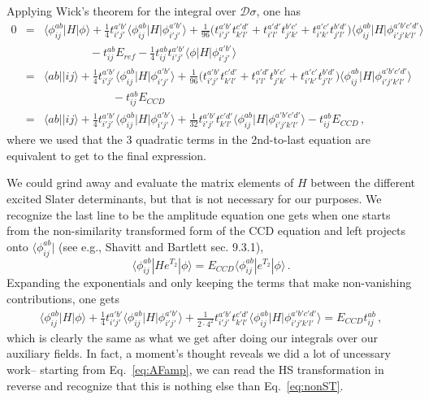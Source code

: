 \documentclass[12pt]{article}
\begin{document}
Applying Wick's theorem for the integral over $\mathcal{D}\sigma$, one has
\begin{eqnarray}
0 &=& \langle\phi^{ab}_{ij}|H|\phi\rangle + \frac{1}{4}t^{a'b'}_{i'j'}\langle\phi^{ab}_{ij}|H|\phi^{a'b'}_{i'j'}\rangle +\frac{1}{96}\bigl(t^{a'b'}_{i'j'}t^{c'd'}_{k'l'} + t^{a'd'}_{i'l'}t^{b'c'}_{j'k'}+t^{a'c'}_{i'k'}t^{b'd'}_{j'l'}\bigr)\langle\phi^{ab}_{ij}|H|\phi^{a'b'c'd'}_{i'j'k'l'}\rangle\nonumber\\
&&\qquad\qquad -t^{ab}_{ij}E_{ref} -\frac{1}{4}t^{ab}_{ij}t^{a'b'}_{i'j'}\langle\phi|H|\phi^{a'b'}_{i'j'}\rangle\\
&=& \langle ab||ij\rangle +  \frac{1}{4}t^{a'b'}_{i'j'}\langle\phi^{ab}_{ij}|H|\phi^{a'b'}_{i'j'}\rangle +\frac{1}{96}\bigl(t^{a'b'}_{i'j'}t^{c'd'}_{k'l'} + t^{a'd'}_{i'l'}t^{b'c'}_{j'k'}+t^{a'c'}_{i'k'}t^{b'd'}_{j'l'}\bigr)\langle\phi^{ab}_{ij}|H|\phi^{a'b'c'd'}_{i'j'k'l'}\rangle\nonumber\\
&&\qquad\qquad\qquad - t^{ab}_{ij}E_{CCD}\\
&=&\langle ab||ij\rangle +  \frac{1}{4}t^{a'b'}_{i'j'}\langle\phi^{ab}_{ij}|H|\phi^{a'b'}_{i'j'}\rangle +\frac{1}{32}t^{a'b'}_{i'j'}t^{c'd'}_{k'l'}\langle\phi^{ab}_{ij}|H|\phi^{a'b'c'd'}_{i'j'k'l'}\rangle-t^{ab}_{ij}E_{CCD}\,,
\end{eqnarray}
where we used that the 3 quadratic terms in the 2nd-to-last equation are equivalent to get to the final expression. 

We could grind away and evaluate the matrix elements of $H$ between the different excited Slater determinants, but that is not necessary for our purposes. We recognize the last line to be the amplitude equation one gets when one starts from the non-similarity transformed form of the CCD equation and left projects onto $\langle\phi^{ab}_{ij}|$ (see e.g., Shavitt and Bartlett sec. 9.3.1),
\begin{equation}
\label{eq:nonST}
\langle\phi^{ab}_{ij}|He^{T_2}|\phi\rangle = E_{CCD}\langle\phi^{ab}_{ij}|e^{T_2}|\phi\rangle\,.
\end{equation}
Expanding the exponentials and only keeping the terms that make non-vanishing contributions, one gets
\begin{eqnarray}
\langle\phi^{ab}_{ij}|H|\phi\rangle + \frac{1}{4}t^{a'b'}_{i'j'}\langle\phi^{ab}_{ij}|H|\phi^{a'b'}_{i'j'}\rangle + \frac{1}{2\cdot 4^2}t^{a'b'}_{i'j'}t^{c'd'}_{k'l'}\langle\phi^{ab}_{ij}|H|\phi^{a'b'c'd'}_{i'j'k'l'}\rangle = E_{CCD}t^{ab}_{ij}\,,
\end{eqnarray}
which is clearly the same as what we get after doing our integrals over our auxiliary fields. In fact, a moment's thought reveals we did a lot of uncessary work-- starting from Eq.~\ref{eq:AFamp}, we can read the HS transformation in reverse and recognize that this is nothing else than Eq.~\ref{eq:nonST}.  
\end{document}
